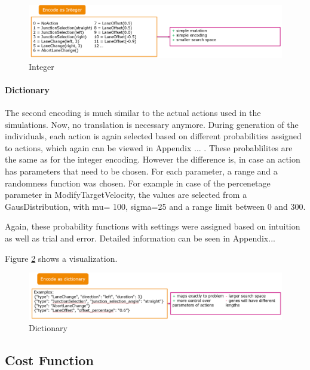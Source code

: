 \begin{figure}[ht] 
	\includegraphics[width=1\linewidth]{figures/int_encoding}
	\caption{Integer}
	\label{figure:encoding:gene:int}
\end{figure}

\paragraph{Dictionary}
The second encoding is much similar to the actual actions used in the simulations. Now, no translation is necessary anymore. During generation of the individuals, each action is again selected based on different probabilities assigned to actions, which again can be viewed in Appendix ... . These probablilites are the same as for the integer encoding. However the difference is, in case an action has parameters that need to be chosen. 
For each parameter, a range and a randomness function was chosen. For example in case of the percenetage parameter in ModifyTargetVelocity, the values are selected from a GausDistribution, with mu= 100, sigma=25 and a range limit between 0 and 300.

Again, these probability functions with settings were assigned based on intuition as well as trial and error. Detailed information can be seen in Appendix...

Figure \ref{figure:encoding:gene:dict} shows a visualization.

\begin{figure}[ht] 
	\includegraphics[width=1\linewidth]{figures/dict_encoding}
	\caption{Dictionary}
	\label{figure:encoding:gene:dict}
\end{figure}

\subsection{Cost Function}
\label{implementation:cost_function}

